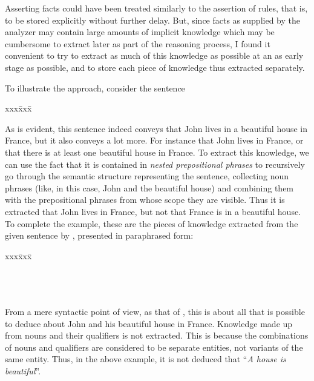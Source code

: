 Asserting facts could have been treated similarly to the assertion of
rules, that is, to be stored explicitly without further delay. But,
since facts as supplied by the analyzer may contain large amounts of
implicit knowledge which may be cumbersome to extract later as part of
the reasoning process, I found it convenient to try to extract as much
of this knowledge as possible at an as early stage as possible, and to
store each piece of knowledge thus extracted separately.

To illustrate the approach, consider the sentence

\begin{tabbing}
  xxx\= xxx\= \kill
  \>
\end{tabbing}
As is evident, this sentence indeed conveys that John lives in a
beautiful house in France, but it also conveys a lot more. For
instance that John lives in France, or that there is at least one
beautiful house in France. To extract this knowledge, we can use the
fact that it is contained in {\em nested prepositional phrases\/} to
recursively go through the semantic structure representing the
sentence, collecting noun phrases (like, in this case, John and the
beautiful house) and combining them with the prepositional phrases
from whose scope they are visible. Thus it is extracted that John
lives in France, but not that France is in a beautiful house. To
complete the example, these are the pieces of knowledge extracted from
the given sentence by {\nash}, presented in paraphrased form:

\begin{tabbing}
  xxx\= xxx\= \kill
  \>\\
  \>\\
  \>\\
  \>\\
  \>
\end{tabbing}
From a mere syntactic point of view, as that of {\nash}, this is about
all that is possible to deduce about John and his beautiful house in
France. Knowledge made up from nouns and their qualifiers is not
extracted. This is because the combinations of nouns and qualifiers
are considered to be separate entities, not variants of the same
entity.  Thus, in the above example, it is not deduced that ``{\em A
house is beautiful\/}''.


